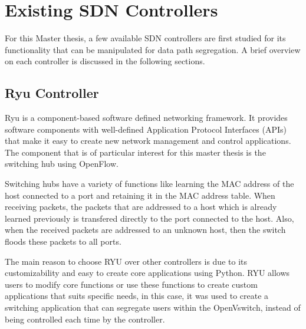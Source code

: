\section{Existing SDN Controllers}\label{existing_sdn_controllers}
For this Master thesis, a few available SDN controllers are first studied for its functionality that can be manipulated for data path segregation. A brief overview on each controller is discussed in the following sections.
\subsection{Ryu Controller \cite{RYU_Switching_Hub}}\label{ryu_controller}
Ryu is a component-based software defined networking framework. It provides software components with well-defined Application Protocol Interfaces (APIs) that make it easy to create new network management and control applications. The component that is of particular interest for this master thesis is the switching hub using OpenFlow.

Switching hubs have a variety of functions like learning the MAC address of the host connected to a port and retaining it in the MAC address table. When receiving packets, the packets that are addressed to a host which is already learned previously is transfered directly to the port connected to the host. Also, when the received packets are addressed to an unknown host, then the switch floods these packets to all ports.




The main reason to choose RYU over other controllers is due to its customizability and easy to create core applications using Python. RYU allows users to modify core functions or use these functions to create custom applications that suits specific needs, in this case, it was used to create a switching application that can segregate users within the OpenVswitch, instead of being controlled each time by the controller.

